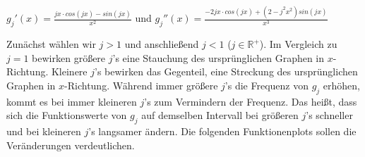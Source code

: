 \documentclass{scrartcl}
\begin{document}
\begin{center}
$g_j'(x) = \frac{jx \cdot cos(jx) - sin(jx)}{x^{2}}$ und $g_j''(x) = \frac{-2jx \cdot cos(jx) + (2-j^{2}x^{2}) sin(jx)}{x^{3}}$
\end{center}

Zunächst wählen wir $j>1$ und anschließend $j<1$ ($j \in \mathbb{R^{+}}$). Im Vergleich zu $j = 1$ bewirken größere $j$'s eine Stauchung des ursprünglichen Graphen in $x$-Richtung. Kleinere $j$'s bewirken das Gegenteil, eine Streckung des ursprünglichen Graphen in $x$-Richtung. Während immer größere $j$'s die Frequenz von $g_j$ erhöhen, kommt es bei immer kleineren $j$'s zum Vermindern der Frequenz. Das heißt, dass sich die Funktionswerte von $g_j$ auf demselben Intervall bei größeren $j$'s schneller und bei kleineren $j$'s langsamer ändern. Die folgenden Funktionenplots sollen die Veränderungen verdeutlichen.
\end{document}
